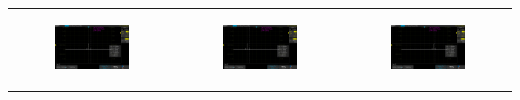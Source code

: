 \documentclass[a4paper,12pt]{article} %
\begin{document}
\begin{table}[ht]
\begin{tabular}{ccc}
\begin{subfigure}{0.3\textwidth}\centering\includegraphics[width=\columnwidth]{III/AKIP0018.png}\end{subfigure} &
\begin{subfigure}{0.3\textwidth}\centering\includegraphics[width=\columnwidth]{III/AKIP0019.png}\end{subfigure} &
\begin{subfigure}{0.3\textwidth}\centering\includegraphics[width=\columnwidth]{III/AKIP0020.png}\end{subfigure} \\

\end{tabular}
\end{table}
\end{document}
